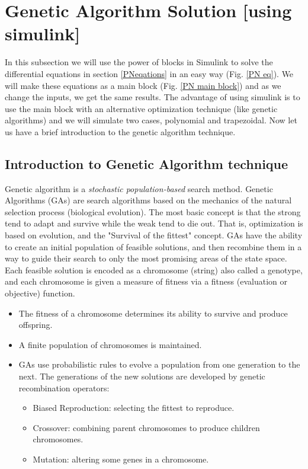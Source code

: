 \section{Genetic Algorithm Solution [using simulink]}


In this subsection we will use the power of blocks in Simulink to solve the differential equations in section \ref{PNeqations} in an easy way (Fig. \ref{PN eq}). We will make these equations as a main block (Fig. \ref{PN main block}) and as we change the inputs, we get the same results. The advantage of using simulink is to use the main block with an alternative optimization technique (like genetic algorithms) and we will simulate two cases, polynomial and trapezoidal. Now let us have a brief introduction to the genetic algorithm technique.

\subsection{Introduction to Genetic Algorithm technique}
Genetic algorithm is a \textit{stochastic population-based} search method. Genetic Algorithms (GAs) are   search algorithms based on the mechanics of the natural selection process (biological evolution).  The most basic concept is that the strong tend to adapt and survive while the weak tend to die out. That is, optimization is based on evolution, and the "Survival of the fittest" concept.
GAs have the ability to create an initial population of feasible solutions, and then recombine them in a way to guide their search to only the most promising areas of the state space.   
Each feasible solution is encoded as a chromosome (string) also called a genotype, and each chromosome is given a measure of fitness via a fitness (evaluation or objective) function. 

\begin{itemize}
	\item The fitness of a chromosome determines its ability to survive and produce offspring.
	\item A finite population of chromosomes is maintained.
	\item GAs  use  probabilistic  rules  to  evolve  a  population from  one  generation to the next.  The generations of the new solutions are developed by genetic recombination operators:
	\begin{itemize}
		\item Biased Reproduction: selecting the fittest to reproduce.
		\item Crossover: combining parent chromosomes to produce children chromosomes.
		\item Mutation: altering some genes in a chromosome.
	\end{itemize}
\end{itemize}


